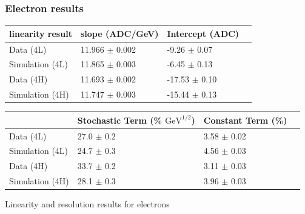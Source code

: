 \documentclass[10pt]{beamer}
\begin{document}
\begin{frame}\frametitle{Electron results}
{\footnotesize
\begin{tabular}{|l|l|l|l|}
\hline
linearity result & slope (ADC/GeV)& Intercept (ADC) \\
\hline
Data (4L) & 11.966 $\pm$ 0.002 & -9.26 $\pm$ 0.07 \\
Simulation (4L) & 11.865 $\pm$ 0.003 & -6.45 $\pm$ 0.13 \\
Data (4H) & 11.693 $\pm$ 0.002 & -17.53 $\pm$ 0.10 \\
Simulation (4H) & 11.747 $\pm$ 0.003 & -15.44 $\pm$ 0.13 \\
\hline
\end{tabular}
\begin{tabular}{|l|l|l|l|}
\hline
& Stochastic Term (\% $\mathrm{GeV}^{1/2}$) & Constant Term (\%) \\
\hline
Data (4L) & 27.0 $\pm$ 0.2 & 3.58 $\pm$ 0.02\\
Simulation (4L) & 24.7 $\pm$ 0.3 & 4.56 $\pm$ 0.03\\
Data (4H) & 33.7 $\pm$ 0.2 & 3.11 $\pm$ 0.03\\
Simulation (4H) & 28.1 $\pm$ 0.3 & 3.96 $\pm$ 0.03\\
\hline
\end{tabular}
}
Linearity and resolution results for electrons
\end{frame}
\end{document}
